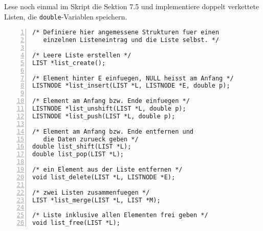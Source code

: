 \begin{aufg} 
Lese noch einmal im Skript die Sektion 7.5 und implementiere doppelt verkettete Listen, die \verb|double|-Variablen speichern.

\medskip\begin{codelisting}
\begin{lstlisting}[numbers=left,numberstyle=\tiny,frame=tlrb]
/* Definiere hier angemessene Strukturen fuer einen
   einzelnen Listeneintrag und die Liste selbst. */

/* Leere Liste erstellen */
LIST *list_create();

/* Element hinter E einfuegen, NULL heisst am Anfang */
LISTNODE *list_insert(LIST *L, LISTNODE *E, double p);

/* Element am Anfang bzw. Ende einfuegen */
LISTNODE *list_unshift(LIST *L, double p);
LISTNODE *list_push(LIST *L, double p);

/* Element am Anfang bzw. Ende entfernen und 
   die Daten zurueck geben */
double list_shift(LIST *L);
double list_pop(LIST *L);

/* ein Element aus der Liste entfernen */
void list_delete(LIST *L, LISTNODE *E);

/* zwei Listen zusammenfuegen */
LIST *list_merge(LIST *L, LIST *M);

/* Liste inklusive allen Elementen frei geben */
void list_free(LIST *L);

\end{lstlisting}
\end{codelisting}
\end{aufg}
